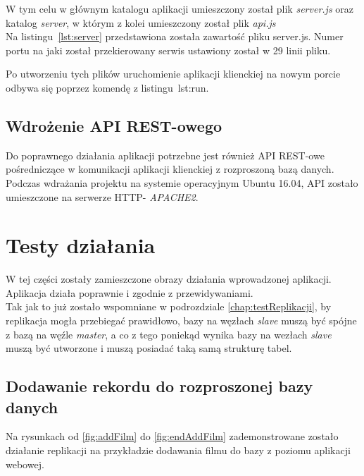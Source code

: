 W tym celu w głównym katalogu aplikacji umieszczony został plik \textit{server.js} oraz katalog \textit{server}, w którym z kolei umieszczony został plik \textit{api.js}\\

Na listingu~\ref{lst:server} przedstawiona została zawartość pliku server.js. Numer portu na jaki został przekierowany serwis ustawiony został w 29 linii pliku.

\lssetdef


\lssetdef


Po utworzeniu tych plików uruchomienie aplikacji klienckiej na nowym porcie odbywa się poprzez komendę z listingu~{lst:run}.

\lssetdef


\subsection{Wdrożenie API REST-owego}
Do poprawnego działania aplikacji potrzebne jest również API REST-owe pośredniczące w komunikacji aplikacji klienckiej z rozproszoną bazą danych. Podczas wdrażania projektu na systemie operacyjnym Ubuntu 16.04, API zostało umieszczone na serwerze HTTP- \textit{APACHE2}.

\section{Testy działania}

W tej części zostały zamieszczone obrazy działania wprowadzonej aplikacji. Aplikacja działa poprawnie i zgodnie z przewidywaniami. \\

Tak jak to już zostało wspomniane w podrozdziale \ref{chap:testReplikacji}, by replikacja mogła przebiegać prawidłowo, bazy na węzłach \textit{slave} muszą być spójne z bazą na węźle \textit{master}, a co z tego poniekąd wynika bazy na wezłach \textit{slave} muszą być utworzone i muszą posiadać taką samą strukturę tabel.

\subsection{Dodawanie rekordu do rozproszonej bazy danych}
Na rysunkach od \ref{fig:addFilm} do \ref{fig:endAddFilm} zademonstrowane zostało działanie replikacji na przykładzie dodawania filmu do bazy z poziomu aplikacji webowej.\\

